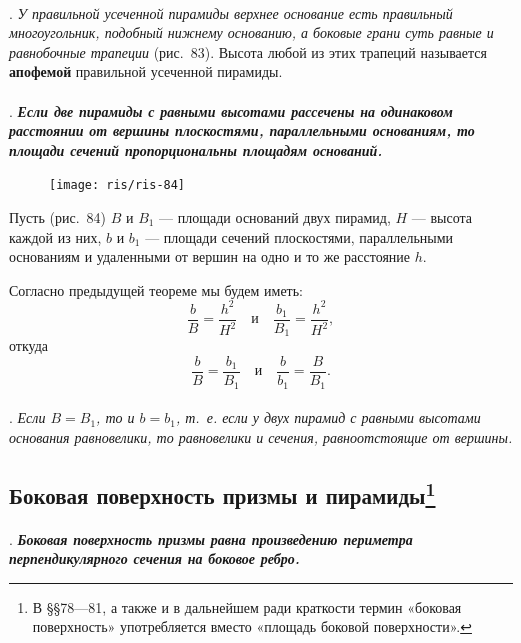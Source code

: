 \documentclass[twoside]{book}
\begin{document}
\paragraph{}\label{1938/s75}
.
\emph{У правильной усеченной пирамиды верхнее основание есть правильный многоугольник, подобный нижнему основанию, а боковые грани суть равные и равнобочные трапеции} (рис.~83).
Высота любой из этих трапеций называется \textbf{апофемой} правильной усеченной пирамиды.

\paragraph{}\label{1938/s76}
.
\textbf{\emph{Если две пирамиды с равными высотами рассечены на одинаковом расстоянии от вершины плоскостями, параллельными основаниям, то площади сечений пропорциональны площадям оснований.}}

\begin{figure}[h!]
\centering
\texttt{[image: ris/ris-84]}
\caption{}
\end{figure}

Пусть (рис.~84) $B$ и $B_1$ --- площади оснований двух пирамид, $H$ --- высота каждой из них, $b$ и $b_1$ --- площади сечений плоскостями, параллельными основаниям и удаленными от вершин на одно и то же расстояние $h$.

Согласно предыдущей теореме мы будем иметь:
\[\frac{b}{B}=\frac{h^2}{H^2}\quad\text{и}\quad\frac{b_1}{B_1}=\frac{h^2}{H^2},\]
откуда
\[\frac{b}{B}=\frac{b_1}{B_1}\quad\text{и}\quad\frac{b}{b_1}=\frac{B}{B_1}.\]
\paragraph{}\label{1938/s77}
.
\emph{Если $B=B_1$, то и $b=b_1$, т.~е. если у двух пирамид с равными высотами основания равновелики, то равновелики и сечения, равноотстоящие от вершины.}

\subsection*{Боковая поверхность призмы и пирамиды\footnote{В §§78---81, а также и в дальнейшем ради краткости термин «боковая поверхность» употребляется вместо «площадь боковой поверхности».}}

\paragraph{}\label{1938/s78}
.
\textbf{\emph{Боковая поверхность призмы равна произведению периметра перпендикулярного сечения на боковое ребро.}}
\end{document}
